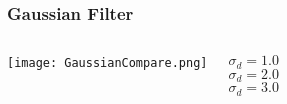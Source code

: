 \documentclass{beamer}
\begin{document}
\begin{frame}
\begin{center}
\frametitle{Gaussian Filter}

\begin{columns}


\texttt{[image: GaussianCompare.png]}


\justifying

$\sigma_d = 1.0$\\

$ $\\

$ $\\

$ $\\

$ $\\

$\sigma_d = 2.0$\\

$ $\\

$ $\\

$ $\\

$ $\\

$\sigma_d = 3.0$

\end{columns}

\end{center}
\end{frame}

\end{document}
